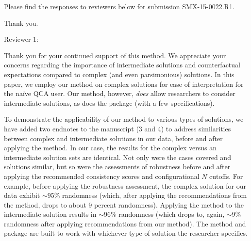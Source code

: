 \documentclass[12pt,stdletter,dateno,sigleft]{newlfm} %
\begin{document}
\begin{newlfm}


Please find the responses to reviewers below for submission SMX-15-0022.R1. %

Thank you. \newline

Reviewer 1: 

Thank you for your continued support of this method. We appreciate your concerns regarding the importance of intermediate solutions and counterfactual expectations compared to complex (and even parsimonious) solutions. In this paper, we employ our method on complex solutions for ease of interpretation for the na{\"i}ve QCA user. Our method, however, \textit{does} allow researchers to consider intermediate solutions, as does the package (with a few specifications). 

To demonstrate the applicability of our method to various types of solutions, we have added two endnotes to the manuscript (3 and 4) to address similarities between complex and intermediate solutions in our data, before and after applying the method. In our case, the results for the complex versus an intermediate solution sets are identical. Not only were the cases covered and solutions similar, but so were the assessments of robustness before and after applying the recommended consistency scores and configurational $N$ cutoffs. For example, before applying the robustness assessment, the complex solution for our data exhibit $\sim$95\% randomness (which, after applying the recommendations from the method, drops to about 9 percent randomness). Applying the method to the intermediate solution results in $\sim$96\% randomness (which drops to, again, $\sim$9\% randomness after applying recommendations from our method). The method and package are built to work with whichever type of solution the researcher specifies. \newline


\end{newlfm}
\end{document}
